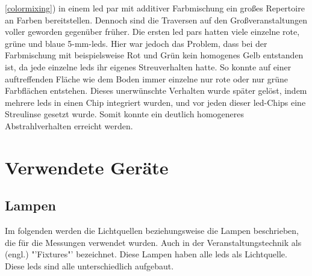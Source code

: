 \documentclass[11pt]{scrartcl}
\begin{document}
\ref{colormixing}) in einem \ac{led} \ac{par} mit additiver Farbmischung ein großes Repertoire an Farben bereitstellen.
Dennoch sind die Traversen auf den Großveranstaltungen voller geworden gegenüber früher.
Die ersten \ac{led} \ac{par}s hatten viele einzelne rote, grüne und blaue 5-mm-\ac{led}s. Hier war jedoch das Problem, dass bei der Farbmischung
mit beispielsweise Rot und Grün kein homogenes Gelb entstanden ist, da jede einzelne \ac{led}s ihr eigenes Streuverhalten hatte. So konnte
auf einer auftreffenden Fläche wie dem Boden immer einzelne nur rote oder nur grüne Farbflächen entstehen. Dieses unerwünschte Verhalten wurde
später gelöst, indem mehrere \ac{led}s in einen Chip integriert wurden, und vor jeden dieser \ac{led}-Chips eine Streulinse gesetzt wurde.
Somit konnte ein deutlich homogeneres Abstrahlverhalten erreicht werden.
\clearpage

\section{Verwendete Geräte}
\subsection{Lampen}
Im folgenden werden die Lichtquellen beziehungsweise die Lampen beschrieben, die für die Messungen verwendet wurden.
Auch in der Veranstaltungstechnik als (engl.) "'Fixtures"' bezeichnet. Diese Lampen haben alle \ac{led}s als Lichtquelle. Diese \ac{led}s
sind alle unterschiedlich aufgebaut.
\end{document}
